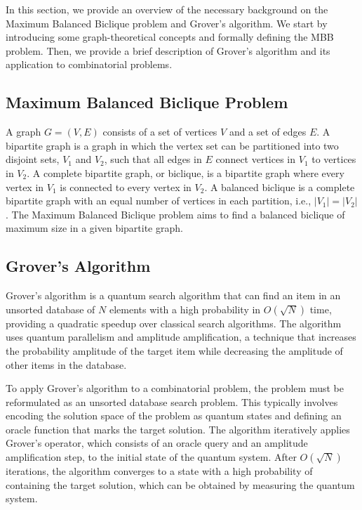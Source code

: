In this section, we provide an overview of the necessary background on the Maximum Balanced Biclique problem and Grover's algorithm. We start by introducing some graph-theoretical concepts and formally defining the MBB problem. Then, we provide a brief description of Grover's algorithm and its application to combinatorial problems.

\subsection{Maximum Balanced Biclique Problem}

A graph $G = (V, E)$ consists of a set of vertices $V$ and a set of edges $E$. A bipartite graph is a graph in which the vertex set can be partitioned into two disjoint sets, $V_1$ and $V_2$, such that all edges in $E$ connect vertices in $V_1$ to vertices in $V_2$. A complete bipartite graph, or biclique, is a bipartite graph where every vertex in $V_1$ is connected to every vertex in $V_2$. A balanced biclique is a complete bipartite graph with an equal number of vertices in each partition, i.e., $|V_1| = |V_2|$. The Maximum Balanced Biclique problem aims to find a balanced biclique of maximum size in a given bipartite graph.

\subsection{Grover's Algorithm}

Grover's algorithm \cite{grover} is a quantum search algorithm that can find an item in an unsorted database of $N$ elements with a high probability in $O(\sqrt{N})$ time, providing a quadratic speedup over classical search algorithms. The algorithm uses quantum parallelism and amplitude amplification, a technique that increases the probability amplitude of the target item while decreasing the amplitude of other items in the database.

To apply Grover's algorithm to a combinatorial problem, the problem must be reformulated as an unsorted database search problem. This typically involves encoding the solution space of the problem as quantum states and defining an oracle function that marks the target solution. The algorithm iteratively applies Grover's operator, which consists of an oracle query and an amplitude amplification step, to the initial state of the quantum system. After $O(\sqrt{N})$ iterations, the algorithm converges to a state with a high probability of containing the target solution, which can be obtained by measuring the quantum system.



